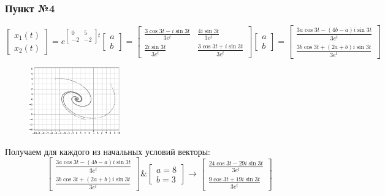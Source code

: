 \documentclass[a3paper,14pt]{extarticle}
\begin{document}
\subsubsection*{Пункт №4}
$$\begin{bmatrix}
    x_1(t) \\ x_2(t)
\end{bmatrix} = e^{\left[\begin{smallmatrix}
    0 & 5 \\ -2 & -2
\end{smallmatrix}\right]t}\begin{bmatrix}
    a \\ b
\end{bmatrix} = \begin{bmatrix}
    \frac{3\cos{3t}-i\sin{3t}}{3e^t} & \frac{4i\sin{3t}}{3e^t} \\
    \frac{2i\sin{3t}}{3e^t} & \frac{3\cos{3t}+i\sin{3t}}{3e^t}
\end{bmatrix}\begin{bmatrix}
    a \\ b
\end{bmatrix} = \begin{bmatrix}
    \frac{3a\cos{3t}-(4b-a)i\sin{3t}}{3e^t} \\ \frac{3b\cos{3t}+(2a+b)i\sin{3t}}{3e^t}
\end{bmatrix}$$
\begin{figure}
    \centering
    \includegraphics[width=0.35\textwidth]{2.4.png}
\end{figure}
Получаем для каждого из начальных условий векторы: $$\begin{bmatrix}
    \frac{3a\cos{3t}-(4b-a)i\sin{3t}}{3e^t} \\ \frac{3b\cos{3t}+(2a+b)i\sin{3t}}{3e^t}
\end{bmatrix} \& \begin{bmatrix}
    a = 8 \\ b = 3
\end{bmatrix} \rightarrow \begin{bmatrix}
    \frac{24\cos{3t}-29i\sin{3t}}{3e^t} \\ \frac{9\cos{3t}+19i\sin{3t}}{3e^t}
\end{bmatrix}$$
\end{document}
